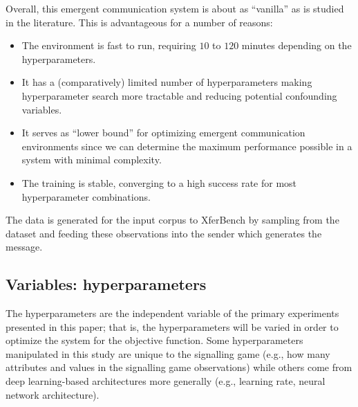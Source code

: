 Overall, this emergent communication system is about as ``vanilla''  as is studied in the literature.
This is advantageous for a number of reasons:
\begin{itemize}[nosep]
  \item The environment is fast to run, requiring $10$ to $120$ minutes depending on the hyperparameters.
  \item It has a (comparatively) limited number of hyperparameters making hyperparameter search more tractable and reducing potential confounding variables.
  \item It serves as ``lower bound'' for optimizing emergent communication environments since we can determine the maximum performance possible in a system with minimal complexity.
  \item The training is stable, converging to a high success rate for most hyperparameter combinations.
\end{itemize}

The data is generated for the input corpus to XferBench by sampling from the dataset and feeding these observations into the sender which generates the message.


\subsection{Variables: hyperparameters}
The hyperparameters are the independent variable of the primary experiments presented in this paper;
  that is, the hyperparameters will be varied in order to optimize the system for the objective function.
Some hyperparameters manipulated in this study are unique to the signalling game (e.g., how many attributes and values in the signalling game observations) while others come from deep learning-based architectures more generally (e.g., learning rate, neural network architecture).

